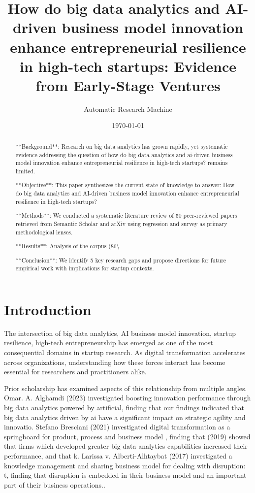 \documentclass[11pt, a4paper]{article}
\title{How do big data analytics and AI-driven business model innovation enhance entrepreneurial resilience in high-tech startups: Evidence from Early-Stage Ventures}
\author{Automatic Research Machine}
\date{\today}
\begin{document}
\maketitle

\begin{abstract}
**Background**: Research on big data analytics has grown rapidly, yet systematic evidence addressing the question of how do big data analytics and ai-driven business model innovation enhance entrepreneurial resilience in high-tech startups? remains limited.

**Objective**: This paper synthesizes the current state of knowledge to answer: How do big data analytics and AI-driven business model innovation enhance entrepreneurial resilience in high-tech startups?

**Methods**: We conducted a systematic literature review of 50 peer-reviewed papers retrieved from Semantic Scholar and arXiv using regression and survey as primary methodological lenses.

**Results**: Analysis of the corpus (86\textbackslash{}%

**Conclusion**: We identify 5 key research gaps and propose directions for future empirical work with implications for startup contexts.
\end{abstract}

\section{Introduction}
The intersection of big data analytics, AI business model innovation, startup resilience, high-tech entrepreneurship has emerged as one of the most consequential domains in startup research. As digital transformation accelerates across organizations, understanding how these forces interact has become essential for researchers and practitioners alike.

Prior scholarship has examined aspects of this relationship from multiple angles. Omar. A. Alghamdi (2023) investigated boosting innovation performance through big data analytics powered by artificial, finding that our findings indicated that big data analytics driven by ai have a significant impact on strategic agility and innovatio. Stefano Bresciani (2021) investigated digital transformation as a springboard for product, process and business model , finding that (2019) showed that firms which developed greater big data analytics capabilities increased their performance, and that k. Larissa v. Alberti-Alhtaybat (2017) investigated a knowledge management and sharing business model for dealing with disruption: t, finding that disruption is embedded in their business model and an important part of their business operations.. 
\end{document}

